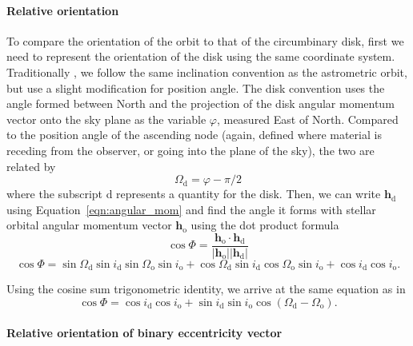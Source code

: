 \documentclass[modern]{aastex61}
\begin{document}
\paragraph{Relative orientation} To compare the orientation of the orbit to that of the circumbinary disk, first we need to represent the orientation of the disk using the same coordinate system. Traditionally \citep[e.g.,][]{czekala15a}, we follow the same inclination convention as the astrometric orbit, but use a slight modification for position angle. The disk convention uses the angle formed between North and the projection of the disk angular momentum vector onto the sky plane as the variable $\varphi$, measured East of North. Compared to the position angle of the ascending node (again, defined where material is receding from the observer, or going into the plane of the sky), the two are related by
\begin{equation}
  \Omega_\mathrm{d} = \varphi - \pi/2
\end{equation}
where the subscript d represents a quantity for the disk. Then, we can write ${\bm h}_\mathrm{d}$ using Equation~\ref{eqn:angular_mom} and find the angle it forms with stellar orbital angular momentum vector ${\bm h}_\mathrm{o}$ using the dot product formula
\begin{equation}
  \cos \Phi = \frac{{\bm h}_\mathrm{o} \cdot {\bm h}_\mathrm{d}}{|{\bm h}_\mathrm{o}| |{\bm h}_\mathrm{d}|}
\end{equation}
\begin{equation}
  \cos \Phi = \sin \Omega_\mathrm{d} \sin i_\mathrm{d} \sin \Omega_\mathrm{o} \sin i_\mathrm{o} + \cos \Omega_\mathrm{d} \sin i_\mathrm{d} \cos \Omega_\mathrm{o} \sin i_\mathrm{o} + \cos i_\mathrm{d} \cos i_\mathrm{o}.
\end{equation}

Using the cosine sum trigonometric identity, we arrive at the same equation as in \citet{fekel81}
\begin{equation}
  \cos \Phi =  \cos i_\mathrm{d} \cos i_\mathrm{o} + \sin i_\mathrm{d} \sin i_\mathrm{o} \cos (\Omega_\mathrm{d} - \Omega_\mathrm{o}).
\end{equation}

\paragraph{Relative orientation of binary eccentricity vector}
\end{document}
